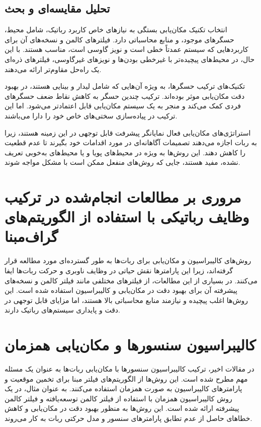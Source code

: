 \subsection{تحلیل مقایسه‌ای و بحث}

انتخاب تکنیک مکان‌یابی بستگی به نیازهای خاص کاربرد رباتیک، شامل محیط، حسگرهای موجود، و منابع محاسباتی دارد. فیلترهای کالمن و نسخه‌های آن برای کاربردهایی که سیستم عمدتاً خطی است و نویز گاوسی است، مناسب هستند. با این حال، در محیط‌های پیچیده‌تر با غیرخطی بودن‌ها و نویزهای غیرگاوسی، فیلترهای ذره‌ای یک راه‌حل مقاوم‌تر ارائه می‌دهند.

تکنیک‌های ترکیب حسگرها، به ویژه آن‌هایی که شامل لیدار و بینایی هستند، در بهبود دقت مکان‌یابی موثر بوده‌اند. ترکیب چندین حسگر به کاهش نقاط ضعف حسگرهای فردی کمک می‌کند و منجر به یک سیستم مکان‌یابی قابل اعتمادتر می‌شود. اما این ترکیب در پیاده‌سازی سختی‌های خاص خود را دارا می‌باشند.

استراتژی‌های مکان‌یابی فعال نمایانگر پیشرفت قابل توجهی در این زمینه هستند، زیرا به ربات اجازه می‌دهند تصمیمات آگاهانه‌ای در مورد اقدامات خود بگیرند تا عدم قطعیت را کاهش دهند. این روش‌ها به ویژه در محیط‌های پویا و یا محیط‌های به‌خوبی تعریف نشده، مفید هستند، جایی که روش‌های منفعل ممکن است با مشکل مواجه شوند.


\section{مروری بر مطالعات انجام‌شده در ترکیب وظایف رباتیکی با استفاده از الگوریتم‌های گراف‌مبنا} 


روش‌های کالیبراسیون و مکان‌یابی برای ربات‌ها به طور گسترده‌ای مورد مطالعه قرار گرفته‌اند، زیرا این پارامترها نقش حیاتی در وظایف ناوبری و حرکت ربات‌ها ایفا می‌کنند. در بسیاری از این مطالعات، از فیلترهای مختلفی مانند فیلتر کالمن و نسخه‌های پیشرفته آن برای بهبود دقت در مکان‌یابی و کالیبراسیون استفاده شده است. این روش‌ها اغلب پیچیده و نیازمند منابع محاسباتی بالا هستند، اما مزایای قابل توجهی در دقت و پایداری سیستم‌های رباتیک دارند.

\section{کالیبراسیون سنسورها و مکان‌یابی همزمان}
در مقالات اخیر، ترکیب کالیبراسیون سنسورها با مکان‌یابی ربات‌ها به عنوان یک مسئله مهم مطرح شده است. این روش‌ها از الگوریتم‌های فیلتر مبنا برای تخمین موقعیت و پارامترهای کالیبراسیون به صورت همزمان استفاده می‌کنند. به عنوان مثال، در \cite{kummerle2012simultaneous} یک روش کالیبراسیون همزمان با استفاده از فیلتر کالمن توسعه‌یافته و فیلتر کالمن پیشرفته ارائه شده است. این روش‌ها به منظور بهبود دقت در مکان‌یابی و کاهش خطاهای حاصل از عدم تطابق پارامترهای سنسور و مدل حرکتی ربات به کار می‌روند. 

